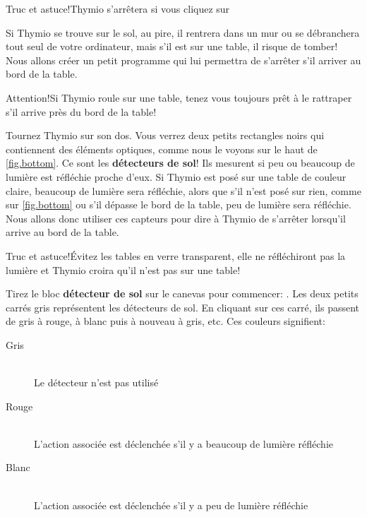\begin{bclogo}[couleur = blue!30, arrondi = 0.1, logo = \bcinfo, ombre = true]{Truc et astuce!}Thymio s'arrêtera si vous cliquez sur 
\end{bclogo}


Si Thymio se trouve sur le sol, au pire, il rentrera dans un mur ou se débranchera tout seul de votre ordinateur, mais s'il est sur une table, il risque de tomber! Nous allons créer un petit programme qui lui permettra de s'arrêter s'il arriver au bord de la table.

\begin{bclogo}[couleur = green!30, arrondi = 0.1, logo = \bctakecare, ombre = true]{Attention!}Si Thymio roule sur une table, tenez vous toujours prêt à le rattraper s'il arrive près du bord de la table!
\end{bclogo}

Tournez Thymio sur son dos. Vous verrez deux petits rectangles noirs qui contiennent des éléments optiques, comme nous le voyons sur le haut de \cref{fig.bottom}. Ce sont les \textbf{détecteurs de sol}! Ils mesurent si peu ou beaucoup de lumière est réfléchie proche d'eux. Si Thymio est posé sur une table de couleur claire, beaucoup de lumière sera réfléchie, alors que s'il n'est posé sur rien, comme sur \cref{fig.bottom} ou s'il dépasse le bord de la table, peu de lumière sera réfléchie. Nous allons donc utiliser ces capteurs pour dire à Thymio de s'arrêter lorsqu'il arrive au bord de la table.

\begin{bclogo}[couleur = blue!30, arrondi = 0.1, logo = \bcinfo, ombre = true]{Truc et astuce!}Évitez les tables en verre transparent, elle ne réfléchiront pas la lumière et Thymio croira qu'il n'est pas sur une table!
\end{bclogo}

Tirez le bloc \textbf{détecteur de sol} sur le canevas pour commencer: . Les deux petits carrés gris représentent les détecteurs de sol. En cliquant sur ces carré, ils passent de gris à rouge, à blanc puis à nouveau à gris, etc. Ces couleurs signifient:

\begin{description}
	\item[Gris] \hfill \\
		Le détecteur n'est pas utilisé
	\item[Rouge] \hfill \\
		L'action associée est déclenchée s'il y a beaucoup de lumière réfléchie
	\item[Blanc] \hfill \\
		L'action associée est déclenchée s'il y a peu de lumière réfléchie
\end{description}

